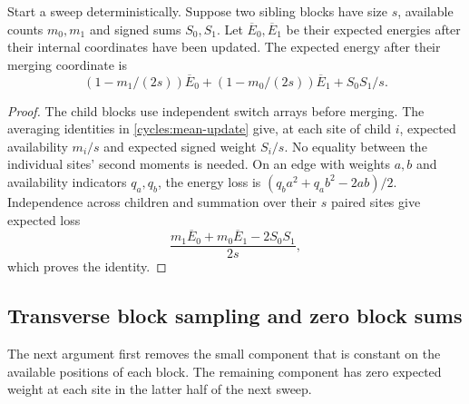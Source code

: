 \begin{lemma}\label{sweeps:merge}
Start a sweep deterministically. Suppose two sibling blocks have size
$s$, available counts $m_0,m_1$ and signed sums $S_0,S_1$. Let
$\overline E_0,\overline E_1$ be their expected energies after their
internal coordinates have been updated. The expected energy after
their merging coordinate is
\begin{equation}\label{sweeps:merge-eq}
 (1-m_1/(2s))\overline E_0+
 (1-m_0/(2s))\overline E_1+S_0S_1/s.
\end{equation}
\end{lemma}
\begin{proof}
The child blocks use independent switch arrays before merging.
The averaging identities in \eqref{cycles:mean-update} give, at each
site of child $i$, expected availability $m_i/s$ and expected signed
weight $S_i/s$. No equality between the individual sites' second
moments is needed. On an edge with weights $a,b$ and availability
indicators $q_a,q_b$, the energy loss is
$(q_ba^2+q_ab^2-2ab)/2$. Independence across children and summation
over their $s$ paired sites give expected loss
\[
 \frac{m_1\overline E_0+m_0\overline E_1-2S_0S_1}{2s},
\]
which proves the identity.
\end{proof}

\subsection{Transverse block sampling and zero block sums}
\label{cycles:zero-block}

The next argument first removes the small component that is constant on
the available positions of each block. The remaining component has zero expected
weight at each site in the latter half of the next sweep.

